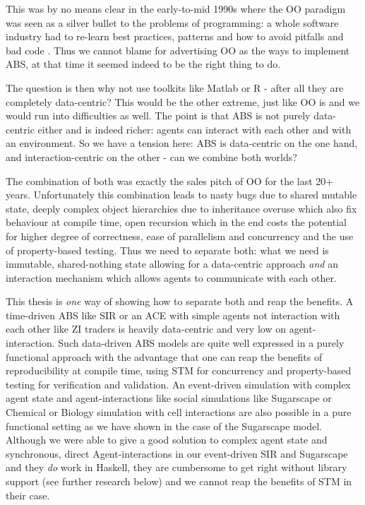 This was by no means clear in the early-to-mid 1990s where the OO paradigm was seen as a silver bullet to the problems of programming: a whole software industry had to re-learn best practices, patterns \cite{gamma_design_1994} and how to avoid pitfalls and bad code \cite{fowler_refactoring:_2012}. Thus we cannot blame \cite{epstein_growing_1996} for advertising OO as the ways to implement ABS, at that time it seemed indeed to be the right thing to do. 

The question is then why not use toolkits like Matlab or R - after all they are completely data-centric? This would be the other extreme, just like OO is and we would run into difficulties as well. The point is that ABS is not purely data-centric either and is indeed richer: agents can interact with each other and with an environment. So we have a tension here: ABS is data-centric on the one hand, and interaction-centric on the other - can we combine both worlds?

The combination of both was exactly the sales pitch of OO for the last 20+ years. Unfortunately this combination leads to nasty bugs due to shared mutable state, deeply complex object hierarchies due to inheritance overuse which also fix behaviour at compile time, open recursion which in the end costs the potential for higher degree of correctness, ease of parallelism and concurrency and the use of property-based testing. Thus we need to separate both: what we need is immutable, shared-nothing state allowing for a data-centric approach \textit{and} an interaction mechanism which allows agents to communicate with each other.

\medskip

This thesis is \textit{one} way of showing how to separate both and reap the benefits. A time-driven ABS like SIR or an ACE with simple agents not interaction with each other like ZI traders is heavily data-centric and very low on agent-interaction. Such data-driven ABS models are quite well expressed in a purely functional approach with the advantage that one can reap the benefits of reproducibility at compile time, using STM for concurrency and property-based testing for verification and validation. An event-driven simulation with complex agent state and agent-interactions like social simulations like Sugarscape or Chemical or Biology simulation with cell interactions are also possible in a pure functional setting as we have shown in the case of the Sugarscape model. Although we were able to give a good solution to complex agent state and synchronous, direct Agent-interactions in our event-driven SIR and Sugarscape and they \textit{do} work in Haskell, they are cumbersome to get right without library support (see further research below) and we cannot reap the benefits of STM in their case. 

